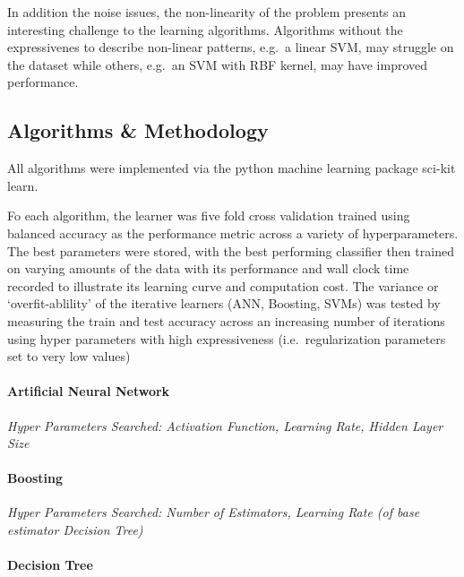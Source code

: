 \documentclass[11pt]{article}
\begin{document}
In addition the noise issues, the non-linearity of the problem presents
an interesting challenge to the learning algorithms. Algorithms without
the expressivenes to describe non-linear patterns, e.g.~a linear SVM,
may struggle on the dataset while others, e.g.~an SVM with RBF kernel,
may have improved performance.

    \hypertarget{algorithms-methodology}{%
\subsection{Algorithms \& Methodology}\label{algorithms-methodology}}

    All algorithms were implemented via the python machine learning package
sci-kit learn.

Fo each algorithm, the learner was five fold cross validation trained
using balanced accuracy as the performance metric across a variety of
hyperparameters. The best parameters were stored, with the best
performing classifier then trained on varying amounts of the data with
its performance and wall clock time recorded to illustrate its learning
curve and computation cost. The variance or `overfit-ablility' of the
iterative learners (ANN, Boosting, SVMs) was tested by measuring the
train and test accuracy across an increasing number of iterations using
hyper parameters with high expressiveness (i.e.~regularization
parameters set to very low values)

\hypertarget{artificial-neural-network}{%
\paragraph{Artificial Neural Network}\label{artificial-neural-network}}

\emph{Hyper Parameters Searched: Activation Function, Learning Rate,
Hidden Layer Size}

\hypertarget{boosting}{%
\paragraph{Boosting}\label{boosting}}

\emph{Hyper Parameters Searched: Number of Estimators, Learning Rate (of
base estimator Decision Tree)}

\hypertarget{decision-tree}{%
\paragraph{Decision Tree}\label{decision-tree}}
\end{document}
